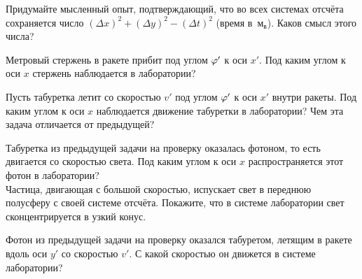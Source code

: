 \documentclass[a4paper,12pt]{article}
\newcommand{\мв}{\,м$_в$}
\begin{document}
\qquad
Придумайте мысленный опыт, подтверждающий, что во всех системах отсчёта сохраняется число $(\Delta x)^2 + (\Delta y)^2 - (\Delta t)^2$ (время в \мв). Каков смысл этого числа?

\qquad
Метровый стержень в ракете прибит под углом $\varphi'$ к оси $x'$. Под каким углом  к оси $x$ стержень наблюдается в лаборатории?

\qquad
Пусть табуретка летит со скоростью $v'$ под углом $\varphi'$ к оси $x'$ внутри ракеты. Под каким углом  к оси $x$ наблюдается движение табуретки в лаборатории? Чем эта задача отличается от предыдущей?

\qquad
{}
Табуретка из предыдущей задачи на проверку оказалась фотоном, то есть двигается со скоростью света. Под каким углом к оси $x$ распространяется этот фотон в лаборатории?\\
Частица, двигающая с большой скоростью, испускает свет в переднюю полусферу с своей системе отсчёта. Покажите, что в системе лаборатории свет сконцентрируется в узкий конус.

\qquad
Фотон из предыдущей задачи на проверку оказался табуретом, летящим в ракете вдоль оси $y'$ со скоростью $v'$. С какой скоростью он движется в системе лаборатории?

\end{document}
